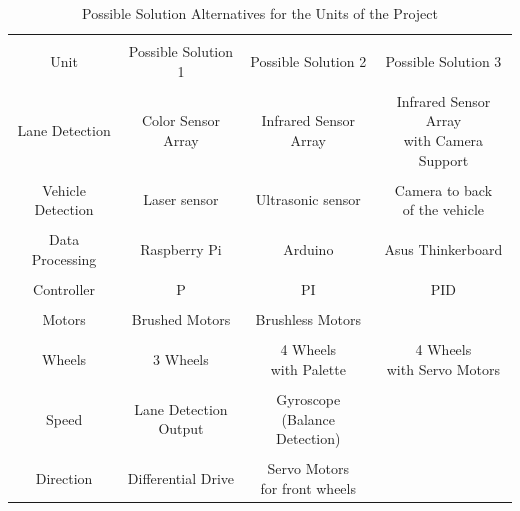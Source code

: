 \documentclass[a4paper,12pt]{article}
\begin{document}
\begin{table}[H]
  \centering
 	 \caption{Possible Solution Alternatives for the  Units of the Project}\vspace{-.2cm}
    \begin{tabular}{| c | c  c  c |}
    \hline 
    	&&& \\
       Unit & Possible Solution 1 & Possible Solution 2  & Possible Solution 3 \\ \hline
       &&& \\
       Lane Detection  & Color Sensor Array & Infrared Sensor Array & \specialcell{ Infrared Sensor  Array \\ with  Camera Support}  \\
       \hline 
       &&& \\
       Vehicle Detection & Laser sensor  & Ultrasonic sensor & \specialcell{Camera to back \\of the vehicle } \\

       \hline 
       &&& \\
       Data Processing & Raspberry Pi & Arduino & Asus Thinkerboard \\ 
       \hline 
       &&& \\
       Controller & P & PI & PID \\ 
       \hline 
       &&& \\
       Motors & Brushed Motors & Brushless Motors & \\
       \hline 
       &&& \\
		Wheels & 3 Wheels  &  \specialcell{4 Wheels \\with Palette}  & \specialcell{4 Wheels \\with Servo Motors}   \\
		\hline 
		&&& \\
		Speed & \specialcell{Lane Detection \\Output} & \specialcell{Gyroscope \\(Balance Detection)}  & \\
		\hline 
		&&& \\
		Direction & Differential Drive & \specialcell{Servo Motors \\ for front wheels}   &
       
       
       \\\hline
      
  \end{tabular}
  \label{tab:solns}
\end{table}				
	
\end{document}
